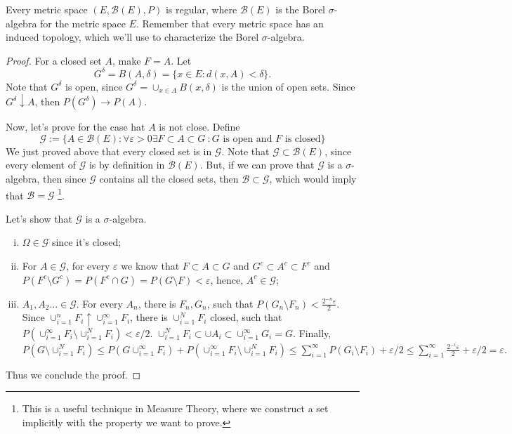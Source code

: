 \begin{theorem}
	Every metric space $(E, \mathcal B(E), P)$ is regular,
	where $\mathcal B(E)$ is the Borel $\sigma$-algebra
	for the metric space $E$. Remember that every
	metric space has an induced topology, which
	we'll use to characterize the Borel $\sigma$-algebra.
\end{theorem}

\begin{proof}
	For a closed set $A$, make $F=A$.
	Let
	\begin{displaymath}
		G^\delta = B(A,\delta) = \{
		x \in E: d(x,A) < \delta
		\}.
	\end{displaymath}
	Note that $G^\delta$ is open, since $G^\delta  = \cup_{x \in A} B(x,\delta)$ is the union of open sets.
	Since $G^\delta \downarrow A$, then $P(G^\delta) \to P(A)$.

	Now, let's prove for the case hat $A$ is not close.
	Define
	\begin{displaymath}
		\mathcal G := \{
		A \in \mathcal B(E): \forall \varepsilon >0 \exists
		F \subset A \subset G \ : G \text{ is open and }
		F \text{ is closed}
		\}
	\end{displaymath}
	We just proved above that every closed set is in $\mathcal G$.
	Note that $\mathcal G \subset \mathcal B(E)$, since
	every element of $\mathcal G$ is by definition in
	$\mathcal B(E)$. But, if we can prove that
	$\mathcal G$ is a $\sigma$-algebra, then
	since $\mathcal G$ contains all the closed sets,
	then $\mathcal B \subset \mathcal G$, which
	would imply that $\mathcal B = \mathcal G$
	\footnote{This is a useful technique in Measure Theory,
		where we construct a set implicitly with the property
		we want to prove.}.

	Let's show that $\mathcal G$ is a $\sigma$-algebra.
	\begin{enumerate}[(i)]
		\item $\Omega \in \mathcal G$ since it's closed;
		\item For $A \in \mathcal G$, for every $\varepsilon$
		      we know that $F \subset A \subset G$ and
		      $G^c \subset A^c \subset F^c$ and
		      $P(F^c \setminus G^c) = P(F^c \cap G)= P(G \setminus F) <\varepsilon$, hence, $A^c \in \mathcal G$;
		\item $A_1,A_2... \in \mathcal G$. For every
		      $A_n$, there is $F_n, G_n$, such that
		      $P(G_n \setminus F_n)< \frac{2^{-n}\varepsilon}{2}$.
		      Since $\cup_{i=1}^n F_i \uparrow \cup^\infty_{i=1}F_i$,
		      there is $\cup^N_{i=1}F_i$ closed,
		      such that $P(\cup^\infty_{i=1} F_i\setminus
			      \cup^N_{i=1}F_i) < \varepsilon/2$.
		      $\cup^N_{i=1}F_i \subset \cup A_i \subset
			      \cup^\infty_{i=1}G_i = G$. Finally,
		      $P(G\setminus \cup^N_{i=1}F_i)\leq
			      P(G\cup^\infty_{i=1}F_i)+
			      P(\cup^\infty_{i=1}F_i \setminus
			      \cup^N_{i=1}F_i) \leq
			      \sum_{i=1}^\infty P(G_i \setminus F_i)
			      + \varepsilon/2 \leq
			      \sum^\infty_{i=1}\frac{2^{-i}\varepsilon}{2}
			      + \varepsilon/2 = \varepsilon.
		      $
	\end{enumerate}
	Thus we conclude the proof.

\end{proof}

